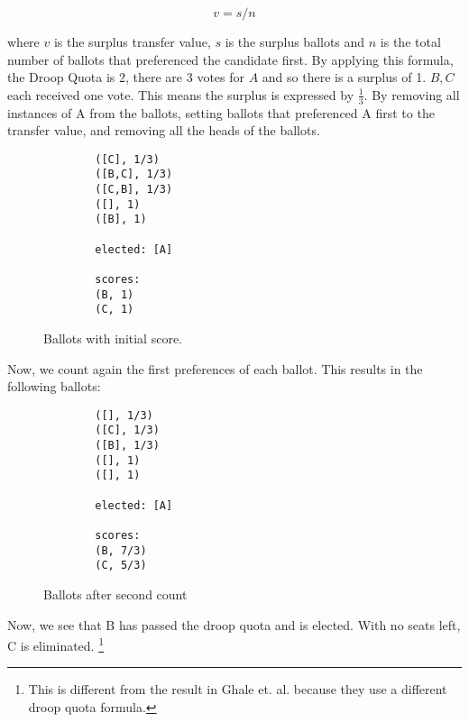 $$
v = s/n
$$

where $v$ is the surplus transfer value, $s$ is the surplus ballots and $n$ is
the total number of ballots that preferenced the candidate first. By applying
this formula, the Droop Quota is 2, there are 3 votes for $A$ and so there is a
surplus of 1. $B, C$ each received one vote. This means the surplus is expressed
by $\frac{1}{3}$. By removing all instances of A from the ballots, setting
ballots that preferenced A first to the transfer value, and removing all the
heads of the ballots.

\begin{figure}[ht!!!!!!!!]
    \caption{Ballots with initial score.}
    \label{sample_election1}
    \begin{lstlisting}
        ([C], 1/3)
        ([B,C], 1/3)
        ([C,B], 1/3)
        ([], 1)
        ([B], 1)
        
        elected: [A]
        
        scores: 
        (B, 1)
        (C, 1)
    \end{lstlisting}
\end{figure}

Now, we count again the first preferences of each ballot. This results in the
following ballots: 

\begin{figure}[ht!!!!!!!!]
    \caption{Ballots after second count}
    \label{sample_election2}
    \begin{lstlisting}
        ([], 1/3)
        ([C], 1/3)
        ([B], 1/3)
        ([], 1)
        ([], 1)
        
        elected: [A]
        
        scores: 
        (B, 7/3)
        (C, 5/3)
    \end{lstlisting}
\end{figure}

Now, we see that B has passed the droop quota and is elected. With no seats
left, C is eliminated. \footnote{This is different from the result in Ghale et.
al. because they use a different droop quota formula.}

